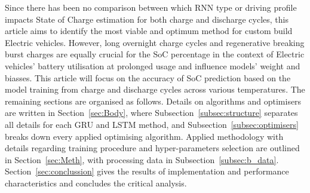 Since there has been no comparison between which RNN type or driving profile impacts State of Charge estimation for both charge and discharge cycles, this article aims to identify the most viable and optimum method for custom build Electric vehicles.
However, long overnight charge cycles and regenerative breaking burst charges are equally crucial for the SoC percentage in the context of Electric vehicles' battery utilisation at prolonged usage and influence models' weight and biasses.
This article will focus on the accuracy of SoC prediction based on the model training from charge and discharge cycles across various temperatures.
%
%
The remaining sections are organised as follows.
Details on algorithms and optimisers are written in Section~\ref{sec:Body}, where Subsection~\ref{subsec:structure} separates all details for each GRU and LSTM method, and Subsection~\ref{subsec:optimisers} breaks down every applied optimising algorithm.
Applied methodology with details regarding training procedure and hyper-parameters selection are outlined in Section~\ref{sec:Meth}, with processing data in Subsection~\ref{subsec:b_data}.
Section~\ref{sec:conclussion} gives the results of implementation and performance characteristics and concludes the critical analysis.
